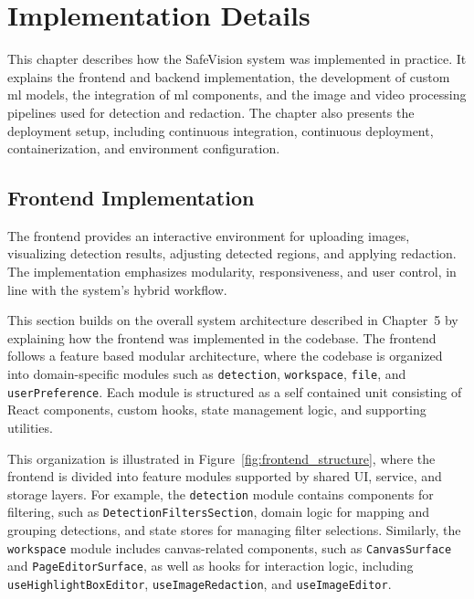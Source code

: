 \chapter{Implementation Details}
\label{chap:implementation_details}

This chapter describes how the \gls{SafeVision} system was implemented in practice. It explains the frontend and backend implementation, the development of custom \acrshort{ml} models, the integration of \acrshort{ml} components, and the image and video processing pipelines used for detection and redaction. The chapter also presents the deployment setup, including continuous integration, continuous deployment, containerization, and environment configuration.

\section{Frontend Implementation}

The frontend provides an interactive environment for uploading images, visualizing detection results, adjusting detected regions, and applying redaction. The implementation emphasizes modularity, responsiveness, and user control, in line with the system’s hybrid workflow.


This section builds on the overall system architecture described in Chapter~5 by explaining how the frontend was implemented in the codebase. The frontend follows a feature based modular architecture, where the codebase is organized into domain-specific modules such as \texttt{detection}, \texttt{workspace}, \texttt{file}, and \texttt{userPreference}. Each module is structured as a self contained unit consisting of React components, custom hooks, state management logic, and supporting utilities.

This organization is illustrated in Figure~\ref{fig:frontend_structure}, where the frontend is divided into feature modules supported by shared UI, service, and storage layers. For example, the \texttt{detection} module contains components for filtering, such as \texttt{DetectionFiltersSection}, domain logic for mapping and grouping detections, and state stores for managing filter selections. Similarly, the \texttt{workspace} module includes canvas-related components, such as \texttt{CanvasSurface} and \texttt{PageEditorSurface}, as well as hooks for interaction logic, including \texttt{useHighlightBoxEditor}, \texttt{useImageRedaction}, and \texttt{useImageEditor}.

